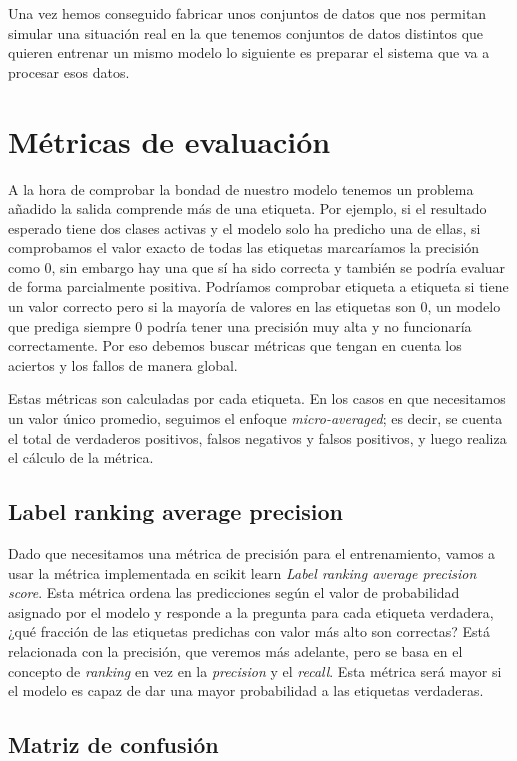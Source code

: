 Una vez hemos conseguido fabricar unos conjuntos de datos que nos permitan simular una situación real en la que tenemos conjuntos de datos distintos que quieren entrenar un mismo modelo lo siguiente es preparar el sistema que va a procesar esos datos.

\section{Métricas de evaluación}

A la hora de comprobar la bondad de nuestro modelo tenemos un problema añadido la salida comprende más de una etiqueta. Por ejemplo, si el resultado esperado tiene dos clases activas y el modelo solo ha predicho una de ellas, si comprobamos el valor exacto de todas las etiquetas marcaríamos la precisión como 0, sin embargo hay una que sí ha sido correcta y también se podría evaluar de forma parcialmente positiva. Podríamos comprobar etiqueta a etiqueta si tiene un valor correcto pero si la mayoría de valores en las etiquetas son 0, un modelo que prediga siempre 0 podría tener una precisión muy alta y no funcionaría correctamente. Por eso debemos buscar métricas que tengan en cuenta los aciertos y los fallos de manera global.

Estas métricas son calculadas por cada etiqueta. En los casos en que necesitamos un valor único promedio, seguimos el enfoque \textit{micro-averaged}; es decir, se cuenta el total de verdaderos positivos, falsos negativos y falsos positivos, y luego realiza el cálculo de la métrica.

\subsection{Label ranking average precision}

Dado que necesitamos una métrica de precisión para el entrenamiento, vamos a usar la métrica implementada en scikit learn \textit{Label ranking average precision score}. Esta métrica ordena las predicciones según el valor de probabilidad asignado por el modelo y responde a la pregunta para cada etiqueta verdadera, ¿qué fracción de las etiquetas predichas con valor más alto son correctas? Está relacionada con la precisión, que veremos más adelante, pero se basa en el concepto de \textit{ranking} en vez en la \textit{precision} y el \textit{recall}. Esta métrica será mayor si el modelo es capaz de dar una mayor probabilidad a las etiquetas verdaderas.

\subsection{Matriz de confusión}

